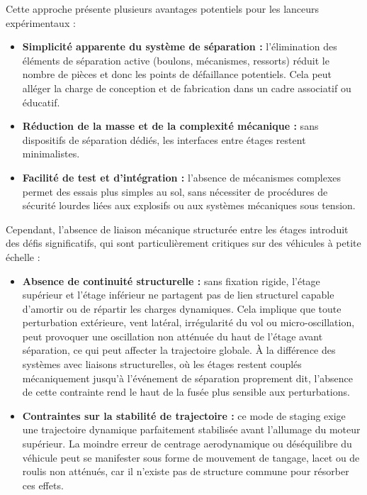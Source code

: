 Cette approche présente plusieurs avantages potentiels pour les lanceurs expérimentaux :
\begin{itemize}
    \item \textbf{Simplicité apparente du système de séparation :} l’élimination des éléments de séparation active (boulons,
    mécanismes, ressorts) réduit le nombre de pièces et donc les points de défaillance potentiels. Cela peut alléger la charge de
    conception et de fabrication dans un cadre associatif ou éducatif.
    \item \textbf{Réduction de la masse et de la complexité mécanique :} sans dispositifs de séparation dédiés, les interfaces
    entre étages restent minimalistes.
    \item \textbf{Facilité de test et d’intégration :} l’absence de mécanismes complexes permet des essais plus simples au sol,
    sans nécessiter de procédures de sécurité lourdes liées aux explosifs ou aux systèmes mécaniques sous tension.\\
\end{itemize}

Cependant, l’absence de liaison mécanique structurée entre les étages introduit des défis significatifs, qui sont particulièrement
critiques sur des véhicules à petite échelle :

\begin{itemize}
    \item \textbf{Absence de continuité structurelle :} sans fixation rigide, l’étage supérieur et l’étage inférieur ne partagent
    pas de lien structurel capable d’amortir ou de répartir les charges dynamiques. Cela implique que toute perturbation
    extérieure, vent latéral, irrégularité du vol ou micro-oscillation, peut provoquer une oscillation non atténuée du haut de
    l’étage avant séparation, ce qui peut affecter la trajectoire globale. À la différence des systèmes avec liaisons
    structurelles, où les étages restent couplés mécaniquement jusqu’à l’événement de séparation proprement dit, l’absence de
    cette contrainte rend le haut de la fusée plus sensible aux perturbations.
    \item \textbf{Contraintes sur la stabilité de trajectoire :} ce mode de staging exige une trajectoire dynamique parfaitement
    stabilisée avant l’allumage du moteur supérieur. La moindre erreur de centrage aerodynamique ou déséquilibre du véhicule peut
    se manifester sous forme de mouvement de tangage, lacet ou de roulis non atténués, car il n’existe pas de structure commune
    pour résorber ces effets.\\
\end{itemize}

